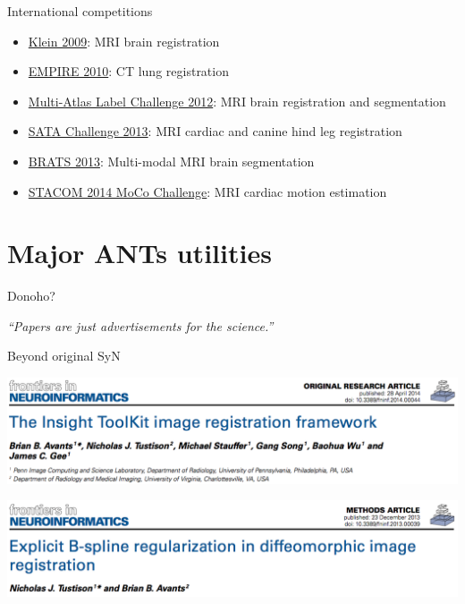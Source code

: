 \documentclass[ignorenonframetext,]{beamer}
\begin{document}
\begin{frame}{International competitions}

\begin{itemize}
\item
  \href{http://www.ncbi.nlm.nih.gov/pubmed/19195496}{Klein 2009}: MRI
  brain registration
\item
  \href{http://empire10.isi.uu.nl}{EMPIRE 2010}: CT lung registration
\item
  \href{https://masi.vuse.vanderbilt.edu/workshop2012/index.php/Main_Page}{Multi-Atlas
  Label Challenge 2012}: MRI brain registration and segmentation
\item
  \href{https://masi.vuse.vanderbilt.edu/workshop2013/index.php/MICCAI_2013_SATA_Challenge_and_Workshop:Current_events}{SATA
  Challenge 2013}: MRI cardiac and canine hind leg registration
\item
  \href{http://martinos.org/qtim/miccai2013/}{BRATS 2013}: Multi-modal
  MRI brain segmentation
\item
  \href{http://www.cardiacatlas.org/web/stacom2014/moco-introduction}{STACOM
  2014 MoCo Challenge}: MRI cardiac motion estimation
\end{itemize}

\end{frame}

\section{Major ANTs utilities}\label{major-ants-utilities}

\begin{frame}{Donoho?}

 \emph{``Papers are just advertisements for the science.''}

\end{frame}

\begin{frame}{Beyond original SyN}

\small

\includegraphics{./papers/figures/Frontiers_ITK.png}

\includegraphics{./papers/figures/Frontiers_BSplineSyN.png}

\end{frame}
\end{document}
